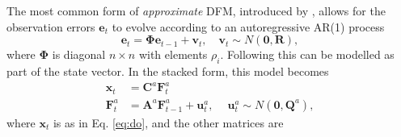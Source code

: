 \documentclass[a4paper]{article}
\begin{document}
The most common form of \emph{approximate} DFM, introduced by \citet{chamberlain2983arbitrage}, allows for the observation errors $\textbf{e}_t$ to evolve according to an autoregressive AR(1) process
\begin{equation} \label{eq:ar1}
\textbf{e}_t = \mathbf{\Phi} \textbf{e}_{t-1} + \textbf{v}_t,\quad \textbf{v}_t\sim N(\textbf{0}, \textbf{R}),
\end{equation}
where $\mathbf{\Phi}$ is diagonal $n\times n$ with elements $\rho_i$. Following \citet{banbura2014maximum} this can be modelled as part of the state vector. 
In the stacked form, this model becomes 
\begin{align} \label{eq:doar1}
\textbf{x}_t &= \textbf{C}^a \textbf{F}_t^a \\
\textbf{F}_t^a &= \textbf{A}^a\textbf{F}^a_{t-1} + \textbf{u}_t^a, \quad\ \textbf{u}_t^a\sim  N(\textbf{0}, \textbf{Q}^a),
\end{align}
where $\textbf{x}_t$ is as in Eq. \ref{eq:do}, and the other matrices are
\end{document}

